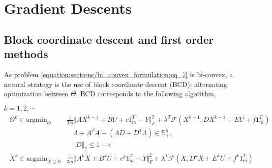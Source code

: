 \documentclass[letterpaper,10pt,english]{sphinxmanual}
\begin{document}
\chapter{Gradient Descents}
\label{\detokenize{sections/gradient_descents:gradient-descents}}\label{\detokenize{sections/gradient_descents:id1}}\label{\detokenize{sections/gradient_descents::doc}}

\section{Block coordinate descent and first order methods}
\label{\detokenize{sections/gradient_descents:block-coordinate-descent-and-first-order-methods}}
As problem \eqref{equation:sections/bi_convex_formulation:eq_7} is bi-convex, a natural strategy is the use of block coordinate descent (BCD): alternating
optimization between \(\Theta\). BCD corresponds to the following algorithm,

 \(k = 1, 2, \cdots\) 
\begin{equation*}
\begin{split}\begin{align}
    \Theta^k \in \text{argmin}_{\Theta} &\frac{1}{2m} \Vert AX^{k-1} + BU + c1_m^T - Y \Vert_F^2 + \lambda^T \mathcal{F}(X^{k-1},DX^{k-1} + EU + f1_m^T) \\
        &\quad \Lambda + A^TA - (\Lambda D + D^T \Lambda) \in \mathbb{S}_+^h, \\
        &\quad \Vert D \Vert_2 \leq 1 - \epsilon \\
    X^k \in \text{argmin}_{X \geq 0} &\frac{1}{2m}\Vert A^kX + B^kU + c^k1_m^T - Y \Vert_F^2 + \lambda^T \mathcal{F}(X,D^kX + E^kU + f^k1_m^T)
\end{align}\end{split}
\end{equation*}
\end{document}
